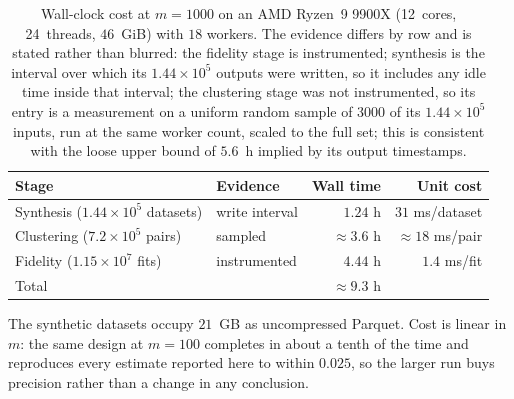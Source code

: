 \documentclass[pdflatex,sn-basic]{sn-jnl}
\begin{document}
\begin{appendices}
\begin{table}[h]
\centering
\caption{Wall-clock cost at $m = 1000$ on an AMD Ryzen~9 9900X (12~cores,
         24~threads, $46$~GiB) with $18$ workers. The evidence differs by row
         and is stated rather than blurred: the fidelity stage is instrumented;
         synthesis is the interval over which its $1.44 \times 10^{5}$ outputs
         were written, so it includes any idle time inside that interval; the
         clustering stage was not instrumented, so its entry is a measurement
         on a uniform random sample of $3000$ of its $1.44 \times 10^{5}$ inputs,
         run at the same worker count, scaled to the full set; this is consistent
         with the loose upper bound of $5.6$~h implied by its output
         timestamps.}
\label{tab:cost}
\small
\begin{tabular}{llrr}
\toprule
Stage & Evidence & Wall time & Unit cost \\
\midrule
Synthesis ($1.44 \times 10^{5}$ datasets) & write interval & $1.24$ h & $31$ ms/dataset \\
Clustering ($7.2 \times 10^{5}$ pairs)    & sampled        & $\approx 3.6$ h & $\approx 18$ ms/pair \\
Fidelity ($1.15 \times 10^{7}$ fits)      & instrumented   & $4.44$ h & $1.4$ ms/fit \\
\midrule
Total & & $\approx 9.3$ h & \\
\bottomrule
\end{tabular}
\end{table}

The synthetic datasets occupy $21$~GB as uncompressed Parquet. Cost is linear in
$m$: the same design at $m = 100$ completes in about a tenth of the time and
reproduces every estimate reported here to within $0.025$, so the larger run
buys precision rather than a change in any conclusion.


\end{appendices}
\end{document}
